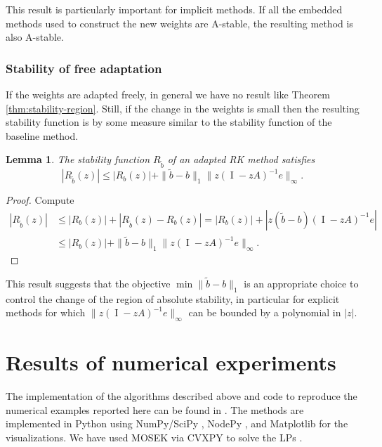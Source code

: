 \documentclass[a4paper]{article}
\numberwithin{equation}{section}
\theoremstyle{plain}
\newtheorem{lemma}[theorem]{Lemma}
\theoremstyle{definition}
\numberwithin{theorem}{section}
\newcommand{\1}{\mathbbm{1}}
\newcommand{\I}{\operatorname{I}}
\newcommand{\bt}{\tilde{b}}
\newcommand{\todo}[1]{{\Large{\color{red}{#1}}}}
\begin{document}
This result is particularly important for implicit methods.
If all the embedded methods used to construct the new weights
are A-stable, the resulting method is also A-stable.


\subsubsection{Stability of free adaptation}
If the weights are adapted freely, in general we have no result like Theorem \ref{thm:stability-region}.
Still, if the change in the weights is small then the resulting stability
function is by some measure similar to the stability function of the baseline
method.

\begin{lemma}
  The stability function $R_{\bt}$ of an adapted RK method
  satisfies
  \begin{equation}
    | R_{\bt}(z) |
    \le
    | R_{b}(z) |
    + \| \bt - b \|_1 \| z (\I - z A)^{-1} e \|_\infty.
  \end{equation}
\end{lemma}
\begin{proof}
  Compute
  \begin{equation}
  \begin{aligned}
    | R_{\bt}(z) |
    &\le
    | R_{b}(z) |
    + | R_{\bt}(z) - R_{b}(z) |
    =
    | R_{b}(z) |
    + | z (\bt - b) (\I - z A)^{-1} e|
    \\
    &\le
    | R_{b}(z) |
    + \| \bt - b \|_1 \| z (\I - z A)^{-1} e \|_\infty.
  \end{aligned}
  \end{equation}
\end{proof}
This result suggests that the objective $\min \| \bt - b \|_1 $ is an
appropriate choice to control the change of the region of absolute stability,
in particular for explicit methods for which
$\| z (\I - z A)^{-1} e \|_\infty$ can be bounded by a polynomial
in $|z|$.


\section{Results of numerical experiments}\label{sec:Numeric_Results}

The implementation of the algorithms described above and code to
reproduce the numerical examples reported here can be found in
\cite{repository}. \todo{TODO: New repository with DOI} %
The methods are implemented in Python using NumPy/SciPy
\cite{virtanen2020scipy}, NodePy \cite{nodepy08}, and
Matplotlib \cite{hunter2007matplotlib} for the visualizations.
We have used MOSEK \cite{mosek} via CVXPY to solve the LPs
\cite{cvxpy, cvxpy_rewriting}.
\end{document}
